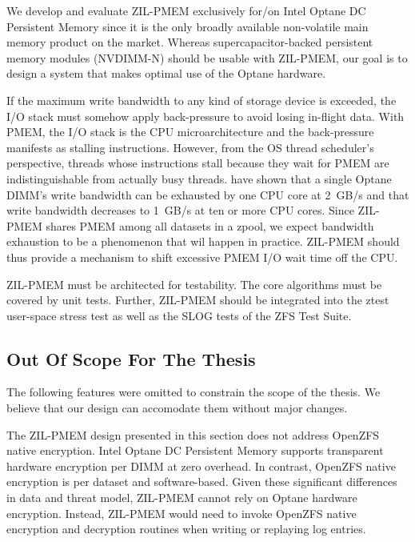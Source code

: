 \documentclass[12pt,a4paper,twoside]{book}
\begin{document}
We develop and evaluate ZIL-PMEM exclusively for/on Intel Optane DC Persistent Memory since it is the only broadly available non-volatile main memory product on the market.
Whereas supercapacitor-backed persistent memory modules (NVDIMM-N) should be usable with ZIL-PMEM, our goal is to design a system that makes optimal use of the Optane hardware.

If the maximum write bandwidth to any kind of storage device is exceeded, the I/O stack must somehow apply back-pressure to avoid losing in-flight data.
With PMEM, the I/O stack is the CPU microarchitecture and the back-pressure manifests as stalling instructions.
However, from the OS thread scheduler's perspective, threads whose instructions stall because they wait for PMEM are indistinguishable from actually busy threads.
\citeauthor{yangEmpiricalGuideBehavior2020} have shown that a single Optane DIMM's write bandwidth can be exhausted by one CPU core at \SI{2}{GB/s} and that write bandwidth decreases to \SI{1}{GB/s} at ten or more CPU cores.
Since ZIL-PMEM shares PMEM among all datasets in a zpool, we expect bandwidth exhaustion to be a phenomenon that wil happen in practice.
ZIL-PMEM should thus provide a mechanism to shift excessive PMEM I/O wait time off the CPU.

ZIL-PMEM must be architected for testability.
The core algorithms must be covered by unit tests.
Further, ZIL-PMEM should be integrated into the ztest user-space stress test as well as the SLOG tests of the ZFS Test Suite.

\subsection{Out Of Scope For The Thesis}
The following features were omitted to constrain the scope of the thesis.
We believe that our design can accomodate them without major changes.

The ZIL-PMEM design presented in this section does not address OpenZFS native encryption.
Intel Optane DC Persistent Memory supports transparent hardware encryption per DIMM at zero overhead.
In contrast, OpenZFS native encryption is per dataset and software-based.
Given these significant differences in data and threat model, ZIL-PMEM cannot rely on Optane hardware encryption.
Instead, ZIL-PMEM would need to invoke OpenZFS native encryption and decryption routines when writing or replaying log entries.
\end{document}
